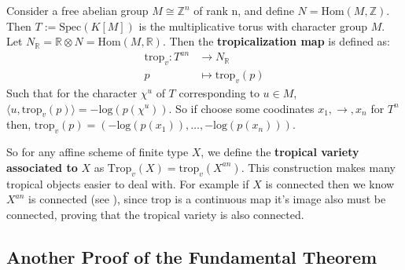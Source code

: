     Consider a free abelian group $M \cong \mathbb{Z}^n$ of rank n, and define $N = \text{Hom}(M,\mathbb{Z})$. 
    Then $T:= \text{Spec}(K[M])$ is the multiplicative torus with character group $M$. 
    Let $N_{\mathbb{R}} = \mathbb{R} \otimes N = \text{Hom}(M,\mathbb{R})$. Then the \textbf{tropicalization map} is defined as:
    \begin{align*}
        \text{trop}_v:T^{an} &\to N_{\mathbb{R}}\\
        p &\mapsto \text{trop}_v(p)
    \end{align*}
    Such that for the character $\chi^u$ of $T$ corresponding to $u \in M$, $\langle u,\text{trop}_{v}(p)\rangle = -\text{log}(p(\chi^{u}))$. So if choose some coodinates $x_1, \to, x_n$ for $T^{n}$ then, $\text{trop}_v(p) = (-\text{log}(p(x_1)), \dots, -\text{log}(p(x_n)))$.
    \par So for any affine scheme of finite type $X$, we define the \textbf{tropical variety associated to }$X$ as $\text{Trop}_v(X) = \text{trop}_v(X^{an})$. 
    This construction makes many tropical objects easier to deal with. 
    For example if $X$ is connected then we know $X^{an}$ is connected (see \cite{berkovich2012spectral}), since $\text{trop}$ is a continuous map it's image also must be connected, proving that the tropical variety is also connected.
\subsection{Another Proof of the Fundamental Theorem}

